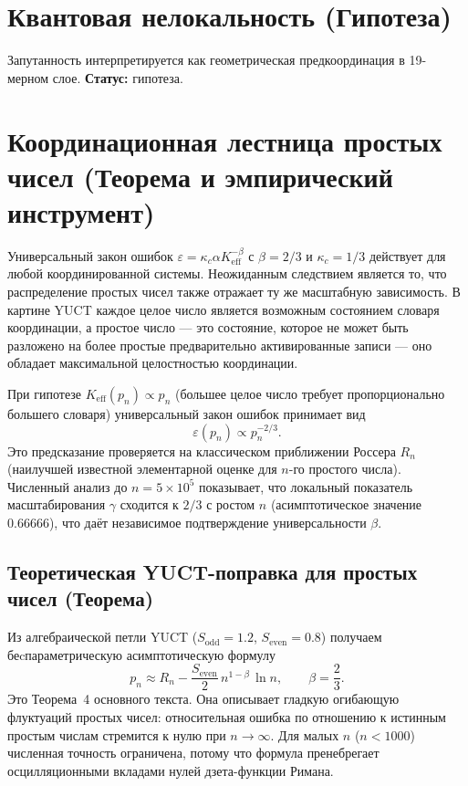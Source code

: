 \documentclass[11pt,a4paper]{article}
\begin{document}
	\section{Квантовая нелокальность (Гипотеза)}
	\label{sec:nonlocality}
	Запутанность интерпретируется как геометрическая предкоординация в 19-мерном слое. \textbf{Статус:} гипотеза.
	
	\section{Координационная лестница простых чисел (Теорема и эмпирический инструмент)}
	\label{sec:primes}
	
	Универсальный закон ошибок \(\varepsilon = \kappa_c\alpha K_{\mathrm{eff}}^{-\beta}\) с \(\beta=2/3\) и \(\kappa_c=1/3\) действует для любой координированной системы. Неожиданным следствием является то, что распределение простых чисел также отражает ту же масштабную зависимость. В картине YUCT каждое целое число является возможным состоянием словаря координации, а простое число — это состояние, которое не может быть разложено на более простые предварительно активированные записи — оно обладает максимальной целостностью координации.
	
	При гипотезе \(K_{\mathrm{eff}}(p_n) \propto p_n\) (большее целое число требует пропорционально большего словаря) универсальный закон ошибок принимает вид
	\[
	\varepsilon(p_n) \propto p_n^{-2/3}.
	\]
	Это предсказание проверяется на классическом приближении Россера \(R_n\) (наилучшей известной элементарной оценке для \(n\)-го простого числа). Численный анализ до \(n = 5\times10^5\) показывает, что локальный показатель масштабирования \(\gamma\) сходится к \(2/3\) с ростом \(n\) (асимптотическое значение \(0.66666\)), что даёт независимое подтверждение универсальности \(\beta\).
	
	\subsection{Теоретическая YUCT-поправка для простых чисел (Теорема)}
	
	Из алгебраической петли YUCT (\(S_{\mathrm{odd}}=1.2\), \(S_{\mathrm{even}}=0.8\)) получаем беcпараметрическую асимптотическую формулу
	\[
	\boxed{p_n \approx R_n - \frac{S_{\mathrm{even}}}{2}\, n^{1-\beta}\,\ln n},
	\qquad \beta = \frac{2}{3}.
	\]
	Это Теорема~4 основного текста. Она описывает гладкую огибающую флуктуаций простых чисел: относительная ошибка по отношению к истинным простым числам стремится к нулю при \(n\to\infty\). Для малых \(n\) (\(n < 1000\)) численная точность ограничена, потому что формула пренебрегает осцилляционными вкладами нулей дзета-функции Римана.
	
\end{document}
